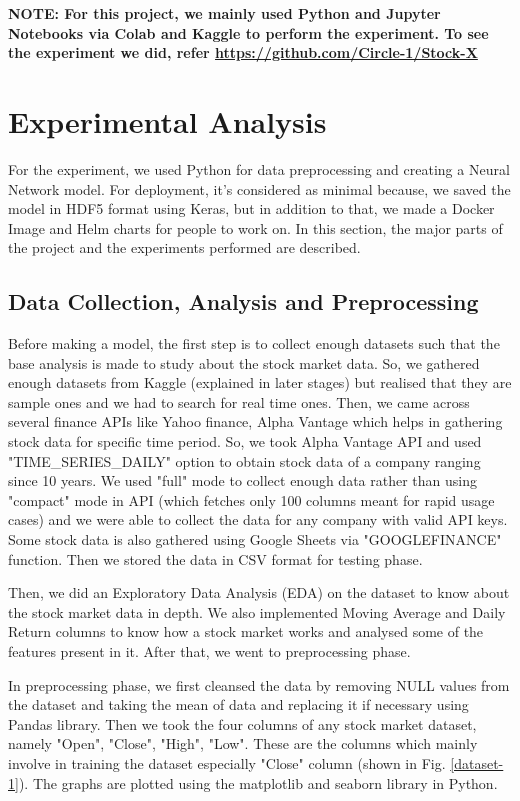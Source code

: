 \documentclass[conference]{IEEEtran}
\begin{document}
\textbf{NOTE: For this project, we mainly used Python and Jupyter Notebooks via Colab and Kaggle to perform the experiment. To see the experiment we did, refer \url{https://github.com/Circle-1/Stock-X}}

\section{Experimental Analysis}
For the experiment, we used Python for data preprocessing and creating a Neural Network model. For deployment, it's considered as minimal because, we saved the model in HDF5 format using Keras, but in addition to that, we made a Docker Image and Helm charts for people to work on. In this section, the major parts of the project and the experiments performed are described.

\subsection{Data Collection, Analysis and Preprocessing}\label{A}
Before making a model, the first step is to collect enough datasets such that the base analysis is made to study about the stock market data. So, we gathered enough datasets from Kaggle (explained in later stages) but realised that they are sample ones and we had to search for real time ones. Then, we came across several finance APIs like Yahoo finance, Alpha Vantage which helps in gathering stock data for specific time period. So, we took Alpha Vantage API and used "TIME\_SERIES\_DAILY" option to obtain stock data of a company ranging since 10 years. We used "full" mode to collect enough data rather than using "compact" mode in API (which fetches only 100 columns meant for rapid usage cases) and we were able to collect the data for any company with valid API keys. Some stock data is also gathered using Google Sheets via "GOOGLEFINANCE" function. Then we stored the data in CSV format for testing phase.

Then, we did an Exploratory Data Analysis (EDA) on the dataset to know about the stock market data in depth. We also implemented Moving Average and Daily Return columns to know how a stock market works and analysed some of the features present in it. After that, we went to preprocessing phase.

In preprocessing phase, we first cleansed the data by removing NULL values from the dataset and taking the mean of data and replacing it if necessary using Pandas library. Then we took the four columns of any stock market dataset, namely "Open", "Close", "High", "Low". These are the columns which mainly involve in training the dataset especially "Close" column (shown in Fig. \ref{dataset-1}). The graphs are plotted using the matplotlib and seaborn library in Python. 
\end{document}
